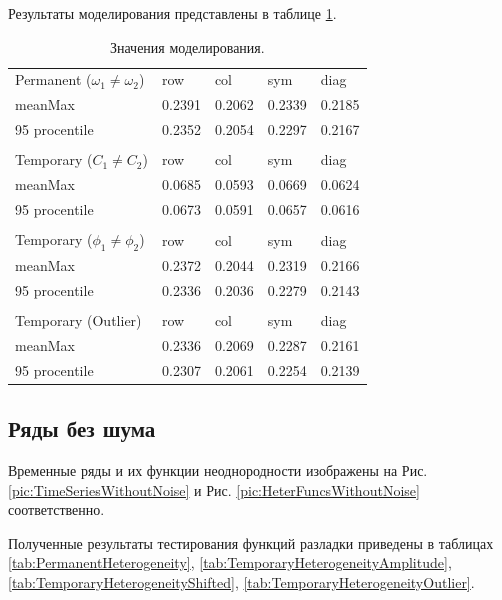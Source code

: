 \documentclass[specialist, substylefile = spbu.rtx,
			   subf, href, 12pt]{disser}
\begin{document}
Результаты моделирования представлены в таблице \ref{tab:ModellingResults}.
\begin{table}[!hhh]
	\center
	\caption{Значения моделирования.}
	\begin{tabular}{lllll}
	    Permanent ($\omega_1 \neq \omega_2$) & row & col & sym & diag \\
	    meanMax & 0.2391 & 0.2062 & 0.2339 & 0.2185 \\
	    95 procentile & 0.2352 & 0.2054 & 0.2297 & 0.2167 \\
	    &  &  &  &  \\
	    Temporary ($C_1 \neq C_2$) & row & col & sym & diag \\
	    meanMax & 0.0685 & 0.0593 & 0.0669 & 0.0624 \\
	    95 procentile & 0.0673 & 0.0591 & 0.0657 & 0.0616 \\
	    &  &  &  &  \\
	    Temporary ($\phi_1 \neq \phi_2$) & row & col & sym & diag \\
	    meanMax & 0.2372 & 0.2044 & 0.2319 & 0.2166 \\
	    95 procentile & 0.2336 & 0.2036 & 0.2279 & 0.2143 \\
	    &  &  &  &  \\
	    Temporary (Outlier) & row & col & sym & diag \\
	    meanMax & 0.2336 & 0.2069 & 0.2287 & 0.2161 \\
	    95 procentile & 0.2307 & 0.2061 & 0.2254 & 0.2139
	\end{tabular}
\label{tab:ModellingResults}
\end{table}


\newpage

\subsection{Ряды без шума}

Временные ряды и их функции неоднородности изображены на Рис. \ref{pic:TimeSeriesWithoutNoise} и Рис. \ref{pic:HeterFuncsWithoutNoise} соответственно.


Полученные результаты тестирования функций разладки приведены в таблицах \ref{tab:PermanentHeterogeneity}, \ref{tab:TemporaryHeterogeneityAmplitude}, \ref{tab:TemporaryHeterogeneityShifted}, \ref{tab:TemporaryHeterogeneityOutlier}.
\end{document}
